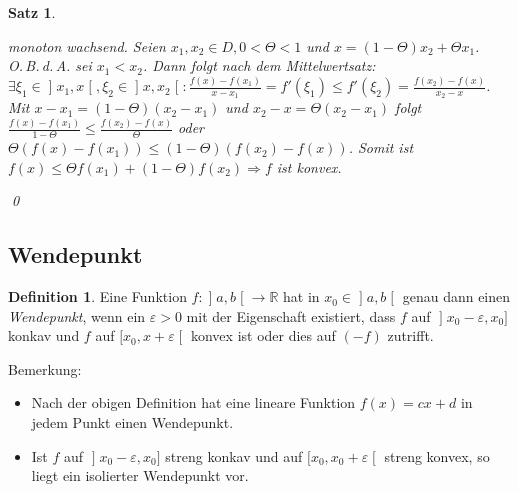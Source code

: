 \documentclass[ngerman,titlepage,twoside, parskip=half*]{scrreprt}
\newcommand*{\R}{\mathbb{R}}
\theoremstyle{plain}
\newtheorem{theorem}{Satz}[section]
\theoremstyle{definition}
\newtheorem{definition}{Definition}
\theoremstyle{remark}
\newcommand*{\lsofint}[1]{\mathopen{]}#1]}   %
\newcommand*{\rsofint}[1]{[#1\mathclose{[}}  %
\newcommand*{\bsofint}[1]{\mathopen{]}#1\mathclose{[}} %
\begin{document}
\begin{theorem}
\begin{enumerate}[(i)]
\begin{itemize}
	  monoton wachsend. Seien $x_1,x_2\in D, 0<\Theta<1$ und 
	  $x=(1-\Theta)x_2+\Theta x_1$.\\
	  O.\,B.\,d.\,A. sei $x_1<x_2$. Dann folgt nach dem Mittelwertsatz:
	  $\exists\xi_1\in\bsofint{x_1,x}, \xi_2\in\bsofint{x,x_2}\colon
	  \frac{f(x)-f(x_1)}{x-x_1}=f'(\xi_1)\leq f'(\xi_2)=
	  \frac{f(x_2)-f(x)}{x_2-x}$. Mit $x-x_1=(1-\Theta)(x_2-x_1)$
	  und $x_2-x=\Theta(x_2-x_1)$ folgt $\frac{f(x)-f(x_1)}{1-\Theta}
	  \leq\frac{f(x_2)-f(x)}{\Theta}$ oder $\Theta(f(x)-f(x_1))\leq
	  (1-\Theta)(f(x_2)-f(x))$. Somit ist $f(x)\leq \Theta f(x_1)+
	  (1-\Theta)f(x_2)\Rightarrow f$ ist konvex.
      \end{itemize}
  \end{enumerate}
  \qed
\end{theorem}

\subsection{Wendepunkt}
\begin{definition}
  Eine Funktion $f\colon\bsofint{a,b}\rightarrow\R$ hat in $x_0\in\bsofint{a,b}$ genau dann
  einen \emph{Wendepunkt}, wenn ein $\varepsilon>0$
  mit der Eigenschaft existiert, dass $f$ auf $\lsofint{x_0-\varepsilon,x_0}$
  konkav und $f$ auf $\rsofint{x_0,x+\varepsilon}$ konvex ist oder dies auf
  $(-f)$ zutrifft.
\end{definition}

Bemerkung:
\begin{itemize}
  \item Nach der obigen Definition hat eine lineare Funktion
    $f(x)=cx+d$  in jedem Punkt einen Wendepunkt.
  \item Ist $f$ auf $\lsofint{x_0-\varepsilon,x_0}$ streng konkav und auf
    $\rsofint{x_0,x_0+\varepsilon}$ streng konvex, so liegt ein isolierter
    Wendepunkt vor.
\end{itemize}
\end{document}
